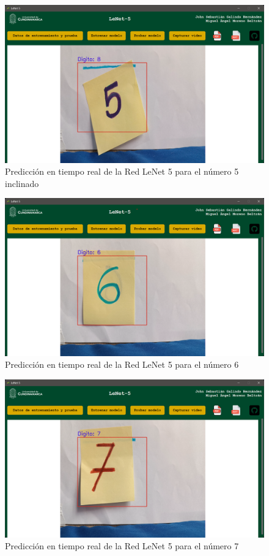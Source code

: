 \begin{figure}[H]
    \centering
    \includegraphics[width=\linewidth]{src/figures/real_test_image_5-2.png}
    \caption{Predicción en tiempo real de la Red LeNet 5 para el número 5 inclinado}
    \label{fig:RealTest_5_2}
\end{figure}

\begin{figure}[H]
    \centering
    \includegraphics[width=\linewidth]{src/figures/real_test_image_6.png}
    \caption{Predicción en tiempo real de la Red LeNet 5 para el número 6}
    \label{fig:RealTest_6}
\end{figure}

\begin{figure}[H]
    \centering
    \includegraphics[width=\linewidth]{src/figures/real_test_image_7.png}
    \caption{Predicción en tiempo real de la Red LeNet 5 para el número 7}
    \label{fig:RealTest_7}
\end{figure}

